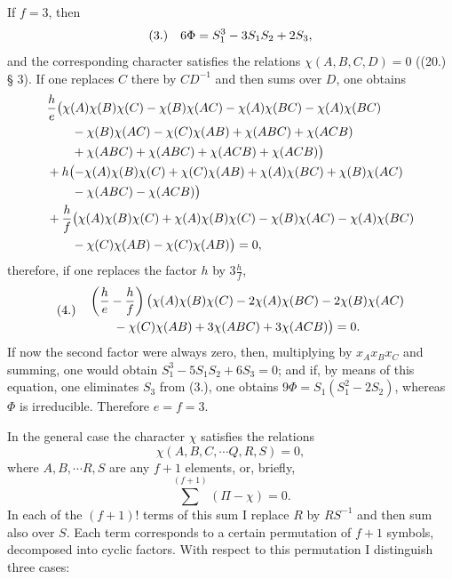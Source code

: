 \documentclass[11pt]{article}
\makeatletter
\newcommand{\frobtag}[2]{\[\begin{array}{@{}r@{\quad}l@{}}\textup{(#1)} & \displaystyle #2\end{array}\]}
\newcommand{\frobtagc}[2]{\[\begin{array}{@{}r@{\quad}c@{}}\textup{(#1)} & \displaystyle #2\end{array}\]}
\makeatother
\begin{document}
If $f=3$, then
\frobtagc{3.}{6\Phi=S_1^3-3S_1S_2+2S_3,}
and the corresponding character satisfies the relations $\chi(A,B,C,D)=0$ ((20.) § 3). If one replaces $C$ there by $CD^{-1}$ and then sums over $D$, one obtains
\[
\begin{aligned}
&\frac{h}{e}\bigl(\chi(A)\chi(B)\chi(C)-\chi(B)\chi(AC)-\chi(A)\chi(BC)-\chi(A)\chi(BC)\nobreak\\
&\qquad{}-\chi(B)\chi(AC)-\chi(C)\chi(AB)+\chi(ABC)+\chi(ACB)\nobreak\\
&\qquad{}+\chi(ABC)+\chi(ABC)+\chi(ACB)+\chi(ACB)\bigr)\nobreak\\
&{}+h\bigl(-\chi(A)\chi(B)\chi(C)+\chi(C)\chi(AB)+\chi(A)\chi(BC)+\chi(B)\chi(AC)\nobreak\\
&\qquad{}-\chi(ABC)-\chi(ACB)\bigr)\nobreak\\
&{}+\frac{h}{f}\bigl(\chi(A)\chi(B)\chi(C)+\chi(A)\chi(B)\chi(C)-\chi(B)\chi(AC)-\chi(A)\chi(BC)\nobreak\\
&\qquad{}-\chi(C)\chi(AB)-\chi(C)\chi(AB)\bigr)=0,
\end{aligned}
\]
therefore, if one replaces the factor $h$ by $3\frac{h}{f}$,
\frobtag{4.}{\begin{aligned}
&\left(\frac{h}{e}-\frac{h}{f}\right)\bigl(\chi(A)\chi(B)\chi(C)-2\chi(A)\chi(BC)-2\chi(B)\chi(AC)\nobreak\\
&\qquad{}-\chi(C)\chi(AB)+3\chi(ABC)+3\chi(ACB)\bigr)=0.
\end{aligned}}
If now the second factor were always zero, then, multiplying by $x_Ax_Bx_C$ and summing, one would obtain $S_1^3-5S_1S_2+6S_3=0$; and if, by means of this equation, one eliminates $S_3$ from (3.), one obtains $9\Phi=S_1(S_1^2-2S_2)$, whereas $\Phi$ is irreducible. Therefore $e=f=3$.

In the general case the character $\chi$ satisfies the relations
\[
\chi(A,B,C,\cdots Q,R,S)=0,
\]
where $A,B,\cdots R,S$ are any $f+1$ elements, or, briefly,
\[
\sum^{(f+1)}(\Pi-\chi)=0.
\]
In each of the $(f+1)!$ terms of this sum I replace $R$ by $RS^{-1}$ and then sum also over $S$. Each term corresponds to a certain permutation of $f+1$ symbols, decomposed into cyclic factors. With respect to this permutation I distinguish three cases:
\end{document}
